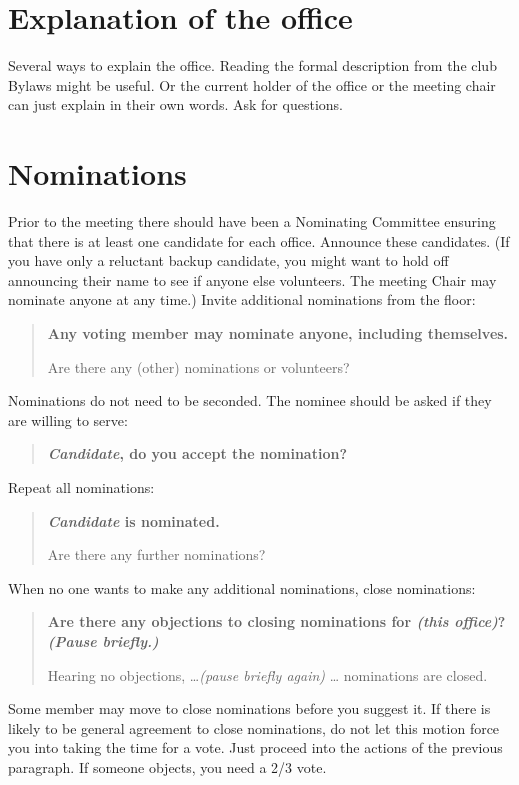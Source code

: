 \documentclass{article}
\newenvironment{chairsays}
               {\parskip 0pt \par %
                \begin{quote}
                 \parskip 0pt \bf}
               {\end{quote}}
\begin{document}
\section{Explanation of the office}

Several ways to explain the office.  Reading the formal description
from the club Bylaws might be useful.  Or the current holder of the
office or the meeting chair can just explain in their own words.
Ask for questions.

\section{Nominations}

Prior to the meeting there should have been a Nominating Committee
ensuring that there is at least one candidate for each office.
Announce these candidates.
(If you have only a reluctant backup candidate, you might want to hold
off announcing their name to see if anyone else volunteers.
The meeting Chair may nominate anyone at any time.)
Invite additional nominations from the floor:
\begin{chairsays}
Any voting member may nominate anyone, including themselves.

Are there any (other) nominations or volunteers?
\end{chairsays}

Nominations do not need to be seconded.
The nominee should be asked if they are willing to serve:
\begin{chairsays}
{\em Candidate\/}, do you accept the nomination?
\end{chairsays}

Repeat all nominations:
\begin{chairsays}
{\em Candidate\/} is nominated.

Are there any further nominations?
\end{chairsays}

When no one wants to make any additional nominations, close
nominations:

\begin{chairsays}
Are there any objections to closing nominations for {\em (this office)\/}?
{\em (Pause briefly.)}

Hearing no objections, \ldots {\em (pause briefly again)\/} \ldots
nominations are closed.
\end{chairsays}

Some member may move to close nominations before you suggest it.  If
there is likely to be general agreement to close nominations, do not
let this motion force you into taking the time for a vote.  Just
proceed into the actions of the previous paragraph.  If someone
objects, you need a 2/3 vote.
\end{document}
